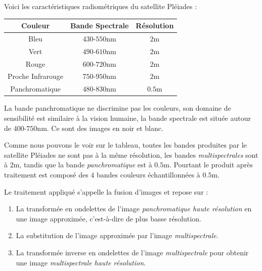 \documentclass[a4paper, 10pt]{report}
\begin{document}
Voici les caractéristiques radiométriques du satellite Pléiades :
\begin{center}
	\begin{tabular}{|c|c|c|}
	\hline
	Couleur & Bande Spectrale & Résolution \\
	\hline 
	Bleu & $430$-$550$nm & $2$m \\ 
	\hline 
	Vert & $490$-$610$nm & $2$m \\ 
	\hline 
	Rouge & $600$-$720$nm & $2$m \\ 
	\hline 
	Proche Infrarouge & $750$-$950$nm & $2$m \\ 
	\hline 
	Panchromatique & $480$-$830$nm & $0.5$m \\ 
	\hline 
	\end{tabular}
\end{center}
La bande panchromatique ne discrimine pas les couleurs, son domaine de sensibilité est similaire à la vision humaine, la bande spectrale est située autour de $400$-$750$nm. Ce sont des images en noir et blanc.

Comme nous pouvons le voir sur le tableau, toutes les bandes produites par le satellite Pléiades ne sont pas à la même résolution, les bandes \emph{multispectrales} sont à $2$m, tandis que la bande \emph{panchromatique} est à $0.5$m.
Pourtant le produit après traitement est composé des $4$ bandes couleurs échantillonnées à $0.5$m.

Le traitement appliqué s'appelle la fusion d'images et repose sur :
\begin{enumerate}
	\item La transformée en ondelettes de l'image \emph{panchromatique haute résolution} en une image approximée, c'est-à-dire de plus basse résolution.
	\item La substitution de l'image approximée par l'image \emph{multispectrale}.
	\item La transformée inverse en ondelettes de l'image \emph{multispectrale} pour obtenir une image \emph{multispectrale haute résolution}.
\end{enumerate}
\end{document}
